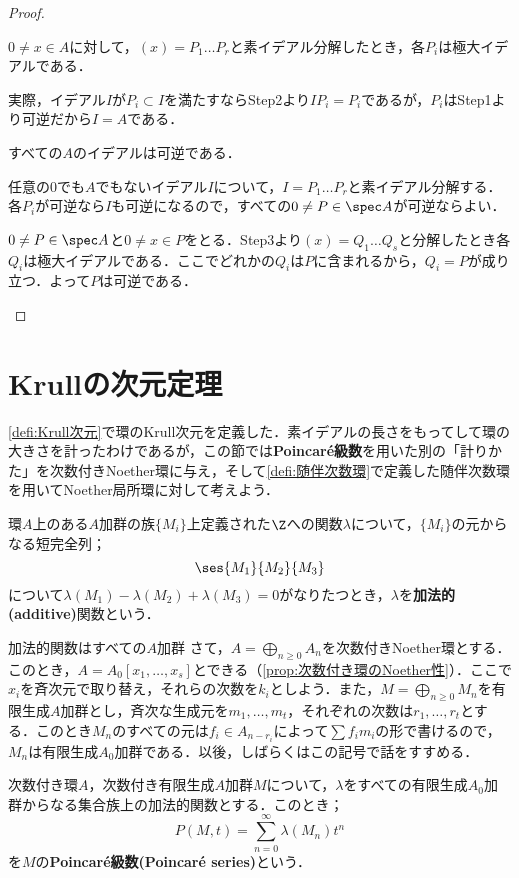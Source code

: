 \begin{proof}
\begin{step}
		\item $0\neq x\in A$に対して，$(x)=P_1\dots P_r$と素イデアル分解したとき，各$P_i$は極大イデアルである．
		
		実際，イデアル$I$が$P_i\subset I$を満たすならStep2より$IP_i=P_i$であるが，$P_i$はStep1より可逆だから$I=A$である．
		
		\item すべての$A$のイデアルは可逆である．
		
		任意の0でも$A$でもないイデアル$I$について，$I=P_1\dots P_r$と素イデアル分解する．各$P_i$が可逆なら$I$も可逆になるので，すべての$0\neq P\in\spec A$が可逆ならよい．
		
		$0\neq P\in\spec A$と$0\neq x\in P$をとる．Step3より$(x)=Q_1\dots Q_s$と分解したとき各$Q_i$は極大イデアルである．ここでどれかの$Q_i$は$P$に含まれるから，$Q_i=P$が成り立つ．よって$P$は可逆である．
	\end{step}
\end{proof}

\section{Krullの次元定理}
\ref{defi:Krull次元}で環のKrull次元を定義した．素イデアルの長さをもってして環の大きさを計ったわけであるが，この節では\textbf{Poincar\'e級数}を用いた別の「計りかた」を次数付きNoether環に与え，そして\ref{defi:随伴次数環}で定義した随伴次数環を用いてNoether局所環に対して考えよう．
\begin{defi}[加法的関数]
	環$A$上のある$A$加群の族$\{M_i\}$上定義された$\Z$への関数$\lambda$について，$\{M_i\}$の元からなる短完全列；
	\[\ses{M_1}{M_2}{M_3}\]
	について$\lambda(M_1)-\lambda(M_2)+\lambda(M_3)=0$がなりたつとき，$\lambda$を\textbf{加法的(additive)}関数という．
\end{defi}

加法的関数はすべての$A$加群
さて，$A=\bigoplus_{n\geq0}A_n$を次数付きNoether環とする．このとき，$A=A_0[x_1,\dots,x_s]$とできる（\ref{prop:次数付き環のNoether性}）．ここで$x_i$を斉次元で取り替え，それらの次数を$k_i$としよう．また，$M=\bigoplus_{n\geq0}M_n$を有限生成$A$加群とし，斉次な生成元を$m_1,\dots,m_t$，それぞれの次数は$r_1,\dots,r_t$とする．このとき$M_n$のすべての元は$f_i\in A_{n-r_i}$によって$\sum f_im_i$の形で書けるので，$M_n$は有限生成$A_0$加群である．以後，しばらくはこの記号で話をすすめる．

\begin{defi}
	次数付き環$A$，次数付き有限生成$A$加群$M$について，$\lambda$をすべての有限生成$A_0$加群からなる集合族上の加法的関数とする．このとき；
	\[P(M,t)=\sum_{n=0}^\infty \lambda(M_n)t^n\]
	を$M$の\textbf{Poincar\'e級数(Poincar\'e series)}という．
\end{defi}

